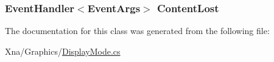 \subsubsection[{Content\+Lost}]{\setlength{\rightskip}{0pt plus 5cm}Event\+Handler$<$Event\+Args$>$ Content\+Lost}\label{classMicrosoft_1_1Xna_1_1Framework_1_1Graphics_1_1DynamicVertexBuffer_a500518294be3cdbe63254f24ccd88c41}


The documentation for this class was generated from the following file\+:\begin{DoxyCompactItemize}
\item 
Xna/\+Graphics/\hyperlink{DisplayMode_8cs}{Display\+Mode.\+cs}\end{DoxyCompactItemize}
